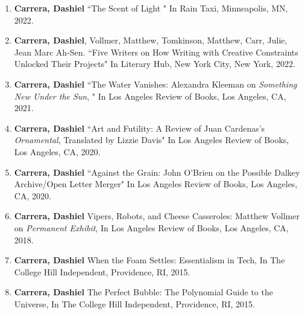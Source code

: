 \begin{enumerate}
\item \textbf{Carrera, Dashiel} ``The Scent of Light " In Rain Taxi, Minneapolis, MN, 2022.\\
%
\item \textbf{Carrera, Dashiel}, Vollmer, Matthew, Tomkinson, Matthew, Carr, Julie, Jean Marc Ah-Sen. ``Five Writers on How Writing with Creative Constraints Unlocked Their Projects" In Literary Hub, New York City, New York, 2022.\\




\item \textbf{Carrera, Dashiel} ``The Water Vanishes: Alexandra Kleeman on \textit{Something New Under the Sun}, " In Los Angeles Review of Books, Los Angeles, CA, 2021.\\
\item \textbf{Carrera, Dashiel} ``Art and Futility: A Review of Juan Cardenas's \textit{Ornamental}, Translated by Lizzie Davis" In Los Angeles Review of Books, Los Angeles, CA, 2020.\\
\item \textbf{Carrera, Dashiel} ``Against the Grain: John O'Brien on the Possible Dalkey Archive/Open Letter Merger" In Los Angeles Review of Books, Los Angeles, CA, 2020. \\
\item \textbf{Carrera, Dashiel} Vipers, Robots, and Cheese Casseroles: Matthew Vollmer on \textit{Permanent Exhibit}, In Los Angeles Review of Books, Los Angeles, CA, 2018.\\
\item \textbf{Carrera, Dashiel} When the Foam Settles: Essentialism in Tech, In The College Hill Independent, Providence, RI, 2015.\\
\item \textbf{Carrera, Dashiel} The Perfect Bubble: The Polynomial Guide to the Universe, In The College Hill Independent, Providence, RI, 2015.\\


\end{enumerate}

